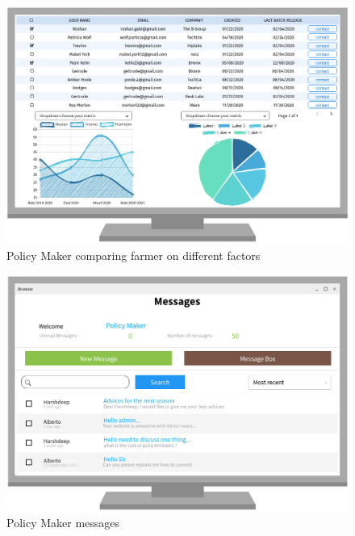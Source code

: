 \begin{figure}[H]
\begin{minipage}{0.48\textwidth}
		\label{Fig:interface_meteo}

	\end{minipage}\hfill

\end{figure}

\begin{figure}[H]

	\centering

	\includegraphics[width=0.8\columnwidth]{Images/release_data_interface.png}

	\caption{Policy Maker comparing farmer on different factors}

	\label{Fig:interface_visu_farmers}

\end{figure}



\begin{figure}[H]

	\centering

	\includegraphics[width=0.8\columnwidth]{Images/messages_policy_maker.png}

	\caption{Policy Maker messages}

	\label{Fig:interface_messages_policy_maker}

\end{figure}


